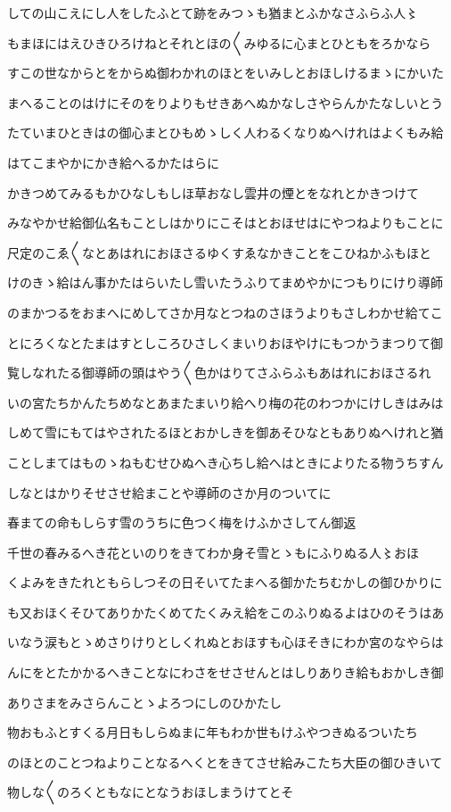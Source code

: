 \documentclass[a4paper,11pt,landscape]{ltjtarticle}
\begin{document}
\par\medskip
しての山こえにし人をしたふとて跡をみつゝも猶まとふかなさふらふ人〻
\par\medskip
もまほにはえひきひろけねとそれとほの〱みゆるに心まとひともをろかなら
\par\medskip
すこの世なからとをからぬ御わかれのほとをいみしとおほしけるまゝにかいた
\par\medskip
まへることのはけにそのをりよりもせきあへぬかなしさやらんかたなしいとう
\par\medskip
たていまひときはの御心まとひもめゝしく人わるくなりぬへけれはよくもみ給
\par\medskip
はてこまやかにかき給へるかたはらに
\par\medskip
かきつめてみるもかひなしもしほ草おなし雲井の煙とをなれとかきつけて
\par\medskip
みなやかせ給御仏名もことしはかりにこそはとおほせはにやつねよりもことに
\par\medskip
尺定のこゑ〱なとあはれにおほさるゆくすゑなかきことをこひねかふもほと
\par\medskip
けのきゝ給はん事かたはらいたし雪いたうふりてまめやかにつもりにけり導師
\par\medskip
のまかつるをおまへにめしてさか月なとつねのさほうよりもさしわかせ給てこ
\par\medskip
とにろくなとたまはすとしころひさしくまいりおほやけにもつかうまつりて御
\par\medskip
覧しなれたる御導師の頭はやう〱色かはりてさふらふもあはれにおほさるれ
\par\medskip
いの宮たちかんたちめなとあまたまいり給へり梅の花のわつかにけしきはみは
\par\medskip
しめて雪にもてはやされたるほとおかしきを御あそひなともありぬへけれと猶
\par\medskip
ことしまてはものゝねもむせひぬへき心ちし給へはときによりたる物うちすん
\par\medskip
しなとはかりそせさせ給まことや導師のさか月のついてに
\par\medskip
春まての命もしらす雪のうちに色つく梅をけふかさしてん御返
\par\medskip
千世の春みるへき花といのりをきてわか身そ雪とゝもにふりぬる人〻おほ
\par\medskip
くよみをきたれともらしつその日そいてたまへる御かたちむかしの御ひかりに
\par\medskip
も又おほくそひてありかたくめてたくみえ給をこのふりぬるよはひのそうはあ
\par\medskip
いなう涙もとゝめさりけりとしくれぬとおほすも心ほそきにわか宮のなやらは
\par\medskip
んにをとたかかるへきことなにわさをせさせんとはしりありき給もおかしき御
\par\medskip
ありさまをみさらんことゝよろつにしのひかたし
\par\medskip
物おもふとすくる月日もしらぬまに年もわか世もけふやつきぬるついたち
\par\medskip
のほとのことつねよりことなるへくとをきてさせ給みこたち大臣の御ひきいて
\par\medskip
物しな〱のろくともなにとなうおほしまうけてとそ
\par\medskip
\end{document}
